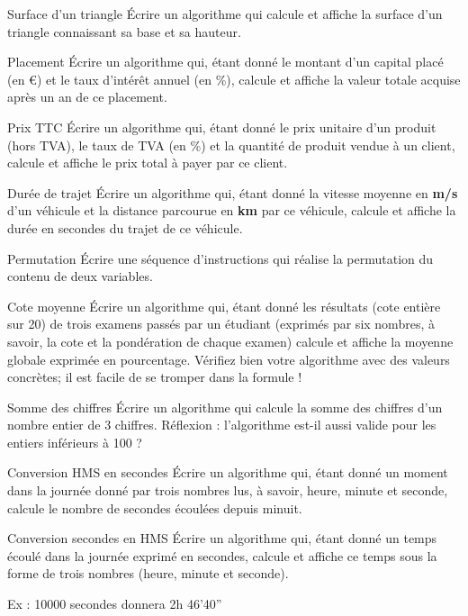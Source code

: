 \begin{Exercice}{Surface d'un triangle}
	Écrire un algorithme qui calcule et affiche la surface
	d'un triangle connaissant sa base et sa hauteur.
\end{Exercice}

\begin{Exercice}{Placement}
	Écrire un algorithme qui, étant donné le montant d’un capital placé (en
	€) et le taux d’intérêt annuel (en \%), calcule et affiche la valeur
	totale acquise après un an de ce placement.
\end{Exercice}

\begin{Exercice}{Prix TTC}
	Écrire un algorithme qui, étant donné le prix unitaire d’un produit
	(hors TVA), le taux de TVA (en \%) et la quantité de produit vendue à
	un client, calcule et affiche le prix total à payer par ce client.
\end{Exercice}

\begin{Exercice}{Durée de trajet}
	Écrire un algorithme qui, étant donné la vitesse moyenne en \textbf{m/s}
	d’un véhicule et la distance parcourue en \textbf{km} par ce véhicule,
	calcule et affiche la durée en secondes du trajet de ce véhicule.
\end{Exercice}

\begin{Exercice}{Permutation}
	Écrire une séquence d’instructions qui réalise la permutation du contenu
	de deux variables.
\end{Exercice}

\begin{Exercice}{Cote moyenne}
	Écrire un algorithme qui, étant donné les résultats (cote entière sur
	20) de trois examens passés par un étudiant (exprimés par six nombres,
	à savoir, la cote et la pondération de chaque examen) calcule et
	affiche la moyenne globale exprimée en pourcentage. Vérifiez bien votre
	algorithme avec des valeurs concrètes; il est facile de se tromper dans
	la formule !
\end{Exercice}

\begin{Exercice}{Somme des chiffres}
	Écrire un algorithme qui calcule la somme des chiffres
	d'un nombre entier de 3 chiffres.
	Réflexion : l’algorithme est-il aussi valide pour les entiers inférieurs
	à 100 ?
\end{Exercice}

\begin{Exercice}{Conversion HMS en secondes}
	Écrire un algorithme qui, étant donné un moment dans la journée donné
	par trois nombres lus, à savoir, heure, minute et seconde, calcule le
	nombre de secondes écoulées depuis minuit.
\end{Exercice}

\begin{Exercice}{Conversion secondes en HMS}
	Écrire un algorithme qui, étant donné un temps écoulé dans la journée
	exprimé en secondes, calcule et affiche ce temps sous la forme de trois
	nombres (heure, minute et seconde).

	Ex : 10000 secondes donnera 2h 46'40''
\end{Exercice}
